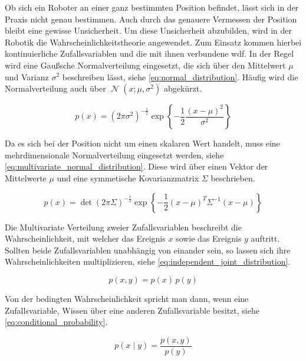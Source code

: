 Ob sich ein Roboter an einer ganz bestimmten Position befindet, lässt sich in der Praxis nicht genau bestimmen. Auch durch das genauere Vermessen der Position bleibt eine gewisse Unsicherheit. Um diese Unsicherheit abzubilden, wird in der Robotik die Wahrscheinlichkeitstheorie angewendet. Zum Einsatz kommen hierbei kontinuierliche Zufallsvariablen und die mit ihnen verbundene \Gls{wdf}. In der Regel wird eine Gaußsche Normalverteilung eingesetzt, die sich über den Mittelwert $\mu$ und Varianz $\sigma^2$ beschreiben lässt, siehe \autoref{eq:normal_distribution}. Häufig wird die Normalverteilung auch über $\operatorname{\mathcal{N}}{(x; \mu, \sigma^2)}$ abgekürzt.

\begin{equation}
p(x) = \left( 2 \pi \sigma^2 \right)^{-\frac12}  \exp{ \left\{ -\frac12 \frac{(x - \mu)^2}{\sigma^2} \right\} } \label{eq:normal_distribution}
\end{equation}

Da es sich bei der Position nicht um einen skalaren Wert handelt, muss eine mehrdimensionale Normalverteilung eingesetzt werden, siehe \autoref{eq:multivariate_normal_distribution}. Diese wird über einen Vektor der Mittelwerte $\mu$ und eine symmetische Kovarianzmatrix $\Sigma$ beschrieben.

\begin{equation}
p(x) = \operatorname{det}{\left( 2 \pi \Sigma \right)}^{-\frac12}  \exp{ \left\{ -\frac12 (x - \mu)^T \Sigma^{-1} (x - \mu) \right\} } \label{eq:multivariate_normal_distribution}
\end{equation}

Die Multivariate Verteilung zweier Zufallsvariablen beschreibt die Wahrscheinlichkeit, mit welcher das Ereignis $x$ sowie das Ereignis $y$ auftritt. Sollten beide Zufallsvariablen unabhängig von einander sein, so lassen sich ihre Wahrscheinlichkeiten multiplizieren, siehe \autoref{eq:independent_joint_distribution}.

\begin{equation}
p(x, y) = p(x) \, p(y) \label{eq:independent_joint_distribution}
\end{equation}

Von der bedingten Wahrscheinlichkeit spricht man dann, wenn eine Zufallsvariable, Wissen über eine anderen Zufallsvariable besitzt, siehe \autoref{eq:conditional_probability}.

\begin{equation}
p(x \mid y) = \frac{p(x, y)}{p(y)} \label{eq:conditional_probability}
\end{equation}

